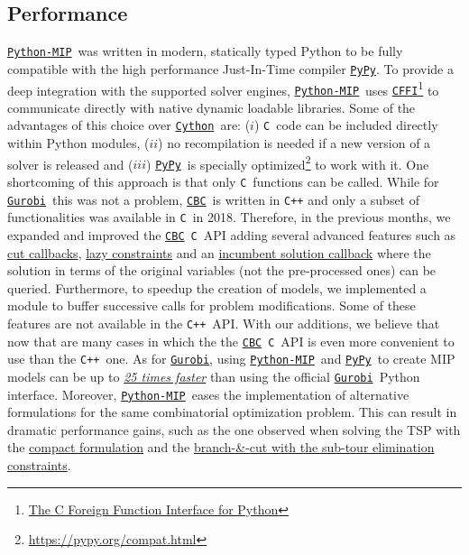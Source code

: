 \documentclass{article}
\def\C{\texttt{C}}
\def\CPP{\texttt{C++}}
\def\Pypy{\href{https://pypy.org}{\texttt{PyPy}}}
\def\Gurobi{\href{www.gurobi.com}{\texttt{Gurobi}\textsuperscript{\textregistered}}}
\def\Cython{\href{https://cython.org/}{\texttt{Cython}}}
\def\CFFI{\href{https://cffi.readthedocs.io}{\texttt{CFFI}}}
\def\CBC{\href{https://github.com/coin-or/cbc}{\texttt{CBC}}}
\def\PythonMIP{\href{https://github.com/coin-or/python-mip}{\texttt{Python-MIP}}}
\begin{document}
\subsection{Performance}
\PythonMIP\ was written in modern, statically typed Python to be fully compatible with the high performance Just-In-Time compiler \Pypy. 
To provide a deep integration with the supported solver engines, \PythonMIP\ uses \CFFI\footnote{\href{https://cffi.readthedocs.io}{The C Foreign Function Interface for Python}} to communicate directly with native dynamic loadable libraries. 
Some of the advantages of this choice over \Cython\ are: ($i$) \C\ code can be included directly within Python modules, ($ii$) no recompilation is needed if a new version of a solver is released and ($iii$) \Pypy\ is specially optimized\footnote{\href{https://pypy.org/compat.html}{https://pypy.org/compat.html}} to work with it. 
One shortcoming of this approach is that only \C\ functions can be called. 
While for \Gurobi\ this was not a problem, \CBC\ is written in \texttt{C++} and only a subset of functionalities was available in \C\ in 2018. 
Therefore, in the previous months, we expanded and improved the \CBC\ \C\ API adding several advanced features such as \href{https://python-mip.readthedocs.io/en/latest/custom.html#cut-callback}{cut callbacks}, \href{https://python-mip.readthedocs.io/en/latest/custom.html#lazy-constraints}{lazy constraints} and an \href{https://python-mip.readthedocs.io/en/latest/classes.html#incumbentupdater}{incumbent solution callback} where the solution in terms of the original variables (not the pre-processed ones) can be queried. 
Furthermore, to speedup the creation of models, we implemented a module to buffer successive calls for problem modifications. 
Some of these features are not available in the \CPP\ API. 
With our additions, we believe that now that are many cases in which the the \CBC\ \C\ API is even more convenient to use than the \CPP\ one.
As for \Gurobi, using \PythonMIP\ and \Pypy\ to create MIP models can be up to \href{https://python-mip.readthedocs.io/en/latest/bench.html#n-queens}{ \emph{25 times faster}} than using the official \Gurobi\ Python interface. 
Moreover, \PythonMIP\ eases the implementation of alternative formulations for the same combinatorial optimization problem.
This can result in dramatic performance gains, such as the one observed when solving the TSP with the \href{https://github.com/coin-or/python-mip/blob/master/examples/tsp-compact.py}{compact formulation} and the \href{https://github.com/coin-or/python-mip/blob/master/examples/tsp-cuts.py}{branch-\&-cut with the sub-tour elimination constraints}.
\end{document}

